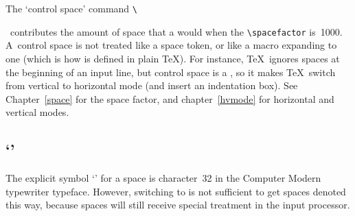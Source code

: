 \documentclass{book}
\begin{document}
The `control space' command \verb-\-
\cstoidx{}\par\
contributes the amount of space that a  would
when the \verb=\spacefactor= is~1000.
A~control space
is not treated like a space token, or like a macro
expanding to one (which is how  is defined in plain \TeX).
For instance, \TeX\ ignores spaces
at the beginning of an input line, but
control space is a , so it 
makes \TeX\ switch from vertical to horizontal mode
(and insert an indentation box).
See  Chapter~\ref{space} for the space factor, and
chapter~\ref{hvmode} for horizontal and vertical modes.

\subsection{`\n{\char32}'}

The explicit symbol `' for a space
is character~32 in the Computer Modern typewriter typeface.
However, switching to  is not sufficient to get
spaces denoted this way, because spaces will still
receive special treatment in the input processor.
\end{document}
